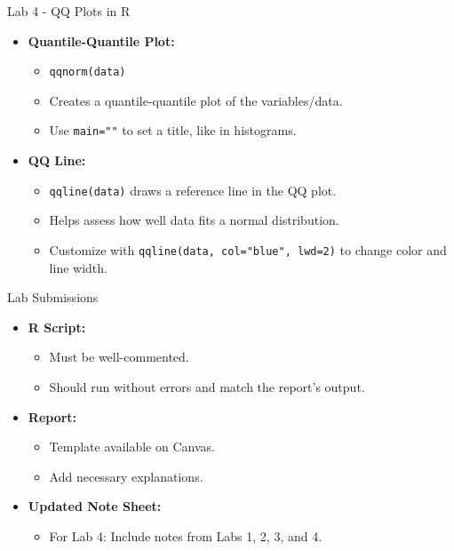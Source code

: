 \documentclass{beamer}
\begin{document}
\begin{frame}{Lab 4 - QQ Plots in R}
    \begin{itemize}
        \item \textbf{Quantile-Quantile Plot:} 
        \begin{itemize}
            \item \texttt{qqnorm(data)}
            \item Creates a quantile-quantile plot of the variables/data.
            \item Use \texttt{main=""} to set a title, like in histograms.
        \end{itemize}
        
        \item \textbf{QQ Line:} 
        \begin{itemize}
            \item \texttt{qqline(data)} draws a reference line in the QQ plot.
            \item Helps assess how well data fits a normal distribution.
            \item Customize with \texttt{qqline(data, col="blue", lwd=2)} to change color and line width.
        \end{itemize}
    \end{itemize}
\end{frame}

\begin{frame}{Lab Submissions}
    \begin{itemize}
        \item \textbf{R Script:}
        \begin{itemize}
            \item Must be well-commented.
            \item Should run without errors and match the report's output.
        \end{itemize}
        \item \textbf{Report:}
        \begin{itemize}
            \item Template available on Canvas.
            \item Add necessary explanations.
        \end{itemize}
        \item \textbf{Updated Note Sheet:} 
        \begin{itemize}
            \item For Lab 4: Include notes from Labs 1, 2, 3, and 4.
        \end{itemize}
    \end{itemize}
\end{frame}
\end{document}
